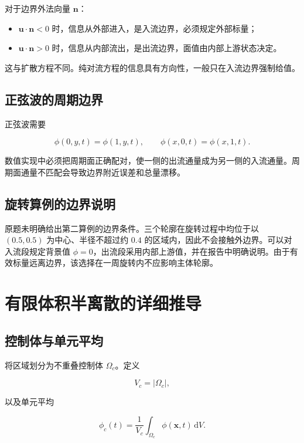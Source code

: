 \documentclass[UTF8,12pt,a4paper,fontset=fandol]{ctexart}
\numberwithin{equation}{section}
\newcommand{\dd}{\,\mathrm d}
\newcommand{\xf}{\bm x}
\begin{document}
对于边界外法向量 $\bm n$：

\begin{itemize}
  \item $\bm u\cdot\bm n<0$ 时，信息从外部进入，是入流边界，必须规定外部标量；
  \item $\bm u\cdot\bm n>0$ 时，信息从内部流出，是出流边界，面值由内部上游状态决定。
\end{itemize}

这与扩散方程不同。纯对流方程的信息具有方向性，一般只在入流边界强制给值。

\subsection{正弦波的周期边界}

正弦波需要

\begin{equation}
  \phi(0,y,t)=\phi(1,y,t),
  \qquad
  \phi(x,0,t)=\phi(x,1,t).
\end{equation}

数值实现中必须把周期面正确配对，使一侧的出流通量成为另一侧的入流通量。周期面通量不匹配会导致边界附近误差和总量漂移。

\subsection{旋转算例的边界说明}

原题未明确给出第二算例的边界条件。三个轮廓在旋转过程中均位于以 $(0.5,0.5)$ 为中心、半径不超过约 $0.4$ 的区域内，因此不会接触外边界。可以对入流段规定背景值 $\phi=0$，出流段采用内部上游值，并在报告中明确说明。由于有效标量远离边界，该选择在一周旋转内不应影响主体轮廓。

\section{有限体积半离散的详细推导}

\subsection{控制体与单元平均}

将区域划分为不重叠控制体 $\Omega_c$。定义

\begin{equation}
  V_c=|\Omega_c|,
\end{equation}

以及单元平均

\begin{equation}
  \phi_c(t)
  =
  \frac1{V_c}
  \int_{\Omega_c}\phi(\xf,t)\dd V.
  \label{eq:cell_average}
\end{equation}
\end{document}
